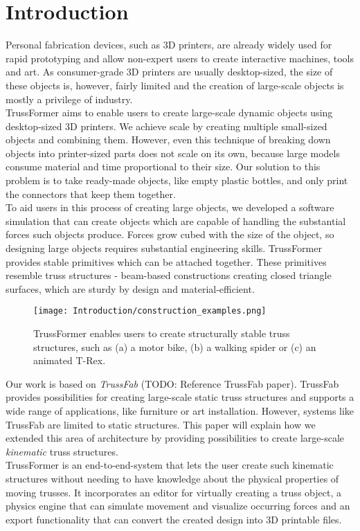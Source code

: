 \chapter{Introduction}\label{ch:introduction}
Personal fabrication devices, such as 3D printers, are already widely used for rapid prototyping and allow non-expert users to create interactive machines, tools and art. As consumer-grade 3D printers are usually desktop-sized, the size of these objects is, however, fairly limited and the creation of large-scale objects is mostly a privilege of industry.\\
TrussFormer aims to enable users to create large-scale dynamic objects using desktop-sized 3D printers. We achieve scale by creating multiple small-sized objects and combining them. However, even this technique of breaking down objects into printer-sized parts does not scale on its own, because large models consume material and time proportional to their size. Our solution to this problem is to take ready-made objects, like empty plastic bottles, and only print the connectors that keep them together.\\
To aid users in this process of creating large objects, we developed a software simulation that can create objects which are capable of handling the substantial forces such objects produce. Forces grow cubed with the size of the object, so designing large objects requires substantial engineering skills. TrussFormer provides stable primitives which can be attached together. These primitives resemble truss structures - beam-based constructions creating closed triangle surfaces, which are sturdy by design and material-efficient.\\
\begin{figure}[h!]
    \texttt{[image: Introduction/construction\_examples.png]}
    \centering
    \caption{TrussFormer enables users to create structurally stable truss structures, such as (a) a motor bike, (b) a walking spider or (c) an animated T-Rex.}
    \label{fig:examples}
\end{figure}
Our work is based on \textit{TrussFab} (TODO: Reference TrussFab paper). TrussFab provides possibilities for creating large-scale static truss structures and supports a wide range of applications, like furniture or art installation. However, systems like TrussFab are limited to static structures. This paper will explain how we extended this area of architecture by providing possibilities to create large-scale \textit{kinematic} truss structures.\\
TrussFormer is an end-to-end-system that lets the user create such kinematic structures without needing to have knowledge about the physical properties of moving trusses. It incorporates an editor for virtually creating a truss object, a physics engine that can simulate movement and visualize occurring forces and an export functionality that can convert the created design into 3D printable files.

